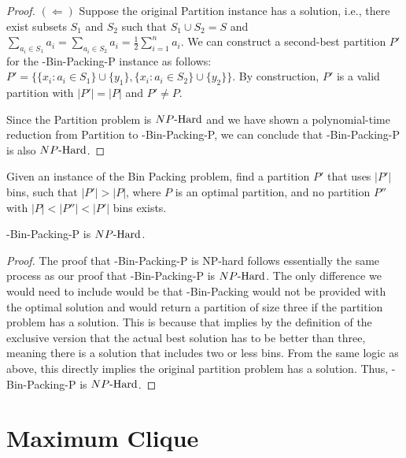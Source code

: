\begin{proof}
$(\Leftarrow)$ Suppose the original Partition instance has a solution, i.e., there exist subsets $S_1$ and $S_2$ such that $S_1 \cup S_2 = S$ and $\sum_{a_i \in S_1} a_i = \sum_{a_i \in S_2} a_i = \frac{1}{2} \sum_{i=1}^n a_i$. We can construct a second-best partition $P'$ for the \inob{}-Bin-Packing-P instance as follows: $P' = \{\{x_i : a_i \in S_1\} \cup \{y_1\}, \{x_i : a_i \in S_2\}\cup\{y_2\}\}$. By construction, $P'$ is a valid partition with $|P'| = |P|$ and $P' \neq P$.

Since the Partition problem is ${NP\text{-Hard{}}}$ and we have shown a polynomial-time reduction from Partition to \inob{}-Bin-Packing-P, we can conclude that \inob{}-Bin-Packing-P is also ${NP\text{-Hard{}}}$.
\end{proof}

\begin{definition}
Given an instance of the Bin Packing problem, find a partition $P'$ that uses $|P'|$ bins, such that $|P'| > |P|$, where $P$ is an optimal partition, and no partition $P''$ with $|P| < |P''| < |P'|$ bins exists.
\end{definition}
\begin{theorem}
\exb{}-Bin-Packing-P is ${NP\text{-Hard{}}}$.
\end{theorem}
\begin{proof}
The proof that \exb{}-Bin-Packing-P is NP-hard follows essentially the same process as our proof that \inob{}-Bin-Packing-P is ${NP\text{-Hard{}}}$. The only difference we would need to include would be that \exb{}-Bin-Packing would not be provided with the optimal solution and would return a partition of size three if the partition problem has a solution. This is because that implies by the definition of the exclusive version that the actual best solution has to be better than three, meaning there is a solution that includes two or less bins. From the same logic as above, this directly implies the original partition problem has a solution. Thus, \exb{}-Bin-Packing-P is ${NP\text{-Hard{}}}$.


\end{proof}



\section{Maximum Clique}

